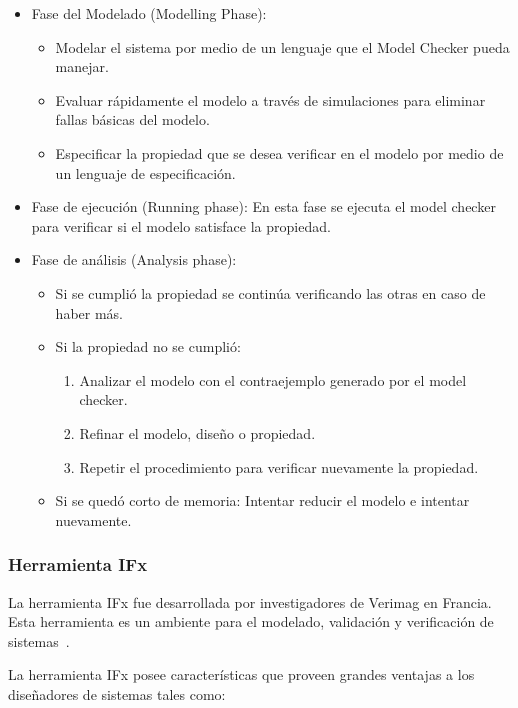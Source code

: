 \begin{itemize}
 \item Fase del Modelado (Modelling Phase):
 \begin{itemize}
 \item Modelar el sistema por medio de un lenguaje que el Model Checker pueda 
manejar.
 \item Evaluar r\'apidamente el modelo a trav\'es de simulaciones para 
eliminar fallas b\'asicas del modelo.
 \item Especificar la propiedad que se desea verificar en el modelo por medio 
de un lenguaje de especificaci\'on.
 \end{itemize}
 \item Fase de ejecuci\'on (Running phase): En esta fase se ejecuta el model 
checker para verificar si el modelo satisface la propiedad.
\item Fase de an\'alisis (Analysis phase):
\begin{itemize}
\item Si se cumpli\'o la propiedad se contin\'ua verificando las otras en caso 
de haber m\'as.
\item Si la propiedad no se cumpli\'o:
\begin{enumerate}
\item Analizar el modelo con el contraejemplo generado por el model checker.
\item Refinar el modelo, dise\~no o propiedad.
\item Repetir el procedimiento para verificar nuevamente la propiedad.
\end{enumerate}
\item Si se qued\'o corto de memoria: Intentar reducir el modelo e intentar 
nuevamente.
\end{itemize}
\end{itemize}


\subsubsection{Herramienta IFx}

La herramienta IFx fue desarrollada por investigadores de Verimag en Francia. 
Esta herramienta es un ambiente para el modelado, validaci\'on y verificaci\'on 
de sistemas~\cite{Bozga2004}. 

La herramienta IFx posee caracter\'isticas que proveen grandes ventajas a los 
dise\~nadores de sistemas tales como:

